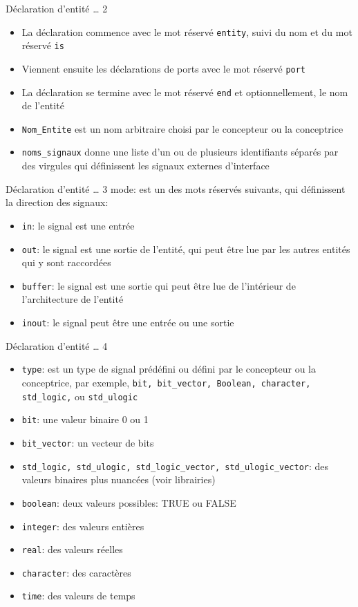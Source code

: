 \documentclass[presentation]{beamer}
\begin{document}
\begin{frame}[label={sec:org11fafa8},fragile]{Déclaration d'entité \ldots{} 2}
 \begin{itemize}
\item La déclaration commence avec le mot réservé \alert{\texttt{entity}}, suivi du nom et du mot réservé \alert{\texttt{is}}
\item Viennent ensuite les déclarations de ports avec le mot réservé \alert{\texttt{port}}
\item La déclaration se termine avec le mot réservé \alert{\texttt{end}} et optionnellement, le nom de l'entité
\item \texttt{Nom\_Entite} est un nom arbitraire choisi par le concepteur ou la conceptrice
\item \texttt{noms\_signaux} donne une liste d'un ou de plusieurs identifiants séparés par des virgules qui définissent les signaux externes d'interface
\end{itemize}
\end{frame}

\begin{frame}[label={sec:orge67762b},fragile]{Déclaration d'entité \ldots{} 3}
 \alert{mode}: est un des mots réservés suivants, qui définissent la direction des signaux:
\begin{itemize}
\item \texttt{in}: le signal est une entrée
\item \texttt{out}: le signal est une sortie de l'entité, qui peut être lue par les autres entités qui y sont raccordées
\item \texttt{buffer}: le signal est une sortie qui peut être lue de l'intérieur de l'architecture de l'entité
\item \texttt{inout}: le signal peut être une entrée ou une sortie
\end{itemize}
\end{frame}

\begin{frame}[label={sec:org1ac2159},fragile]{Déclaration d'entité \ldots{} 4}
 \begin{itemize}
\item \texttt{type}: est un type de signal prédéfini ou défini par le concepteur ou la conceptrice, par exemple, \texttt{bit, bit\_vector, Boolean, character, std\_logic,} ou \texttt{std\_ulogic}
\item \texttt{bit}: une valeur binaire  0 ou 1
\item \texttt{bit\_vector}: un vecteur de bits
\item \texttt{std\_logic, std\_ulogic, std\_logic\_vector, std\_ulogic\_vector}: des valeurs binaires plus nuancées (voir librairies)
\item \texttt{boolean}: deux valeurs possibles: TRUE ou FALSE
\item \texttt{integer}: des valeurs entières
\item \texttt{real}: des valeurs réelles
\item \texttt{character}: des caractères
\item \texttt{time}: des valeurs de temps
\end{itemize}
\end{frame}
\end{document}
